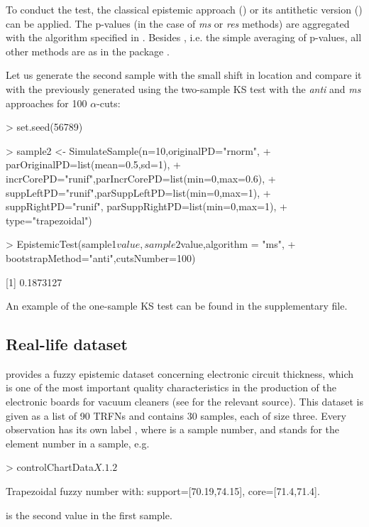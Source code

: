 To conduct the test, the classical epistemic approach () or its antithetic version () can be applied.
The p-values (in the case of \emph{ms} or \emph{res} methods) are aggregated with the algorithm specified in .
Besides , i.e. the simple averaging of p-values, all other methods are as in the package  \citep{palassoArt}.

Let us generate the second sample with the small shift in location and compare it with the previously generated  using the two-sample KS test with the \emph{anti} and \emph{ms} approaches for 100 $\alpha$-cuts:
\begin{example}
> set.seed(56789)

> sample2 <- SimulateSample(n=10,originalPD="rnorm",
+  parOriginalPD=list(mean=0.5,sd=1),
+  incrCorePD="runif",parIncrCorePD=list(min=0,max=0.6),
+  suppLeftPD="runif",parSuppLeftPD=list(min=0,max=1),
+  suppRightPD="runif", parSuppRightPD=list(min=0,max=1),
+  type="trapezoidal")

> EpistemicTest(sample1$value,sample2$value,algorithm = "ms",
+  bootstrapMethod="anti",cutsNumber=100)

[1] 0.1873127
\end{example}
An example of the one-sample KS test can be found in the supplementary file.




\subsection{Real-life dataset}


 provides a fuzzy epistemic dataset  concerning electronic circuit thickness, which is one of the most important quality characteristics in the production of the electronic boards for vacuum cleaners (see \cite{FARAZ20102684} for the relevant source).
This dataset is given as a list of 90 TRFNs and contains 30 samples, each of size three.
Every observation has its own label , where  is a sample number, and  stands for the element number in a sample, e.g.
\begin{example}
> controlChartData$X.1.2$

Trapezoidal fuzzy number with:
   support=[70.19,74.15],
      core=[71.4,71.4].
\end{example}
is the second value in the first sample.



